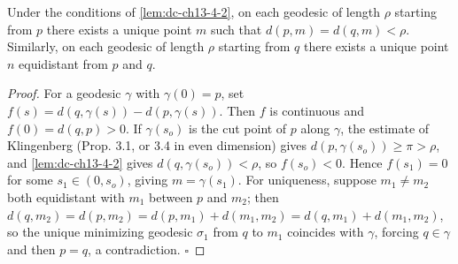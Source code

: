 \begin{lemma}
  \label{lem:dc-ch13-4-3}
  Under the conditions of \cref{lem:dc-ch13-4-2}, on each geodesic of length $\rho$ starting from
  $p$ there exists a unique point $m$ such that $d(p,m)=d(q,m)<\rho$. Similarly, on
  each geodesic of length $\rho$ starting from $q$ there exists a unique point $n$
  equidistant from $p$ and $q$.
\end{lemma}
\begin{proof}
  For a geodesic $\gamma$ with $\gamma(0)=p$, set
  $f(s)=d(q,\gamma(s))-d(p,\gamma(s))$. Then $f$ is continuous and $f(0)=d(q,p)>0$. If
  $\gamma(s_o)$ is the cut point of $p$ along $\gamma$, the estimate of Klingenberg
  (Prop. 3.1, or 3.4 in even dimension) gives $d(p,\gamma(s_o))\geq\pi>\rho$, and
  \cref{lem:dc-ch13-4-2} gives $d(q,\gamma(s_o))<\rho$, so $f(s_o)<0$. Hence $f(s_1)=0$ for some
  $s_1\in(0,s_o)$, giving $m=\gamma(s_1)$. For uniqueness, suppose $m_1\neq m_2$ both
  equidistant with $m_1$ between $p$ and $m_2$; then
  $d(q,m_2)=d(p,m_2)=d(p,m_1)+d(m_1,m_2)=d(q,m_1)+d(m_1,m_2)$, so the unique minimizing
  geodesic $\sigma_1$ from $q$ to $m_1$ coincides with $\gamma$, forcing $q\in\gamma$
  and then $p=q$, a contradiction. $\square$
\end{proof}

